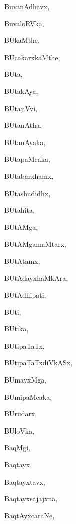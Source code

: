 \begin{multicols}{3}
{\noindent
{BuvanAdhavx}, \pageref{BuvanAdhavx}

\noindent
{BuvaloRVka}, \pageref{BuvaloRVka}

\noindent
{BUkaMthe}, \pageref{BUkaMthe}

\noindent
{BUcakarxkaMthe}, \pageref{BUcakarxkaMthe}

\noindent
{BUta}, \pageref{BUta}

\noindent
{BUtakAya}, \pageref{BUtakAya}

\noindent
{BUtajiVvi}, \pageref{BUtajiVvi}

\noindent
{BUtanAtha}, \pageref{BUtanAtha}

\noindent
{BUtanAyaka}, \pageref{BUtanAyaka}

\noindent
{BUtapaMcaka}, \pageref{BUtapaMcaka}

\noindent
{BUtabarxhamx}, \pageref{BUtabarxhamx}

\noindent
{BUtashudidhx}, \pageref{BUtashudidhx}

\noindent
{BUtahita}, \pageref{BUtahita}

\noindent
{BUtAMga}, \pageref{BUtAMga}

\noindent
{BUtAMgamaMtarx}, \pageref{BUtAMgamaMtarx}

\noindent
{BUtAtamx}, \pageref{BUtAtamx}

\noindent
{BUtAdayxhaMkAra}, \pageref{BUtAdayxhaMkAra}

\noindent
{BUtAdhipati}, \pageref{BUtAdhipati}

\noindent
{BUti}, \pageref{BUti}

\noindent
{BUtika}, \pageref{BUtika}

\noindent
{BUtipaTaTx}, \pageref{BUtipaTaTx}

\noindent
{BUtipaTaTxdiVkASx}, \pageref{BUtipaTaTxdiVkASx}

\noindent
{BUmayxMga}, \pageref{BUmayxMga}

\noindent
{BUmipaMcaka}, \pageref{BUmipaMcaka}

\noindent
{BUrudarx}, \pageref{BUrudarx}

\noindent
{BUloVka}, \pageref{BUloVka}

\noindent
{BaqMgi}, \pageref{BaqMgi}

\noindent
{Baqtayx}, \pageref{Baqtayx}

\noindent
{Baqtayxtavx}, \pageref{Baqtayxtavx}

\noindent
{Baqtayxsajajxna}, \pageref{Baqtayxsajajxna}

\noindent
{BaqtAyxcaraNe}, \pageref{BaqtAyxcaraNe}

}
\end{multicols}
